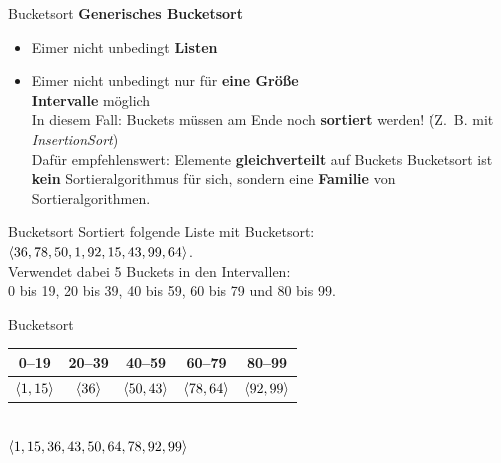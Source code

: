 \begin{frame}{Bucketsort}
	\textbf{Generisches Bucketsort} \\
	\begin{itemize}
		\item Eimer nicht unbedingt \textbf{Listen}
		\item Eimer nicht unbedingt nur für \textbf{eine Größe} \\
		\impl \textbf{Intervalle} möglich \\
		\§{\impl} In diesem Fall: Buckets müssen am Ende noch \textbf{sortiert} werden! 
		\. (Z.~B. mit \emph{InsertionSort}) \\
		\impl Dafür empfehlenswert: Elemente \textbf{gleichverteilt} auf Buckets
		\implitem Bucketsort ist \textbf{kein} Sortieralgorithmus für sich, sondern eine \textbf{Familie} von Sortieralgorithmen. 
	\end{itemize}
\end{frame}


\begin{frame}{Bucketsort}
	Sortiert folgende Liste mit Bucketsort: \\ $\langle 36, 78, 50, 1, 92, 15, 43, 99, 64 \rangle$. \\ 
	Verwendet dabei 5 Buckets in den Intervallen: \\
	0 bis 19, 20 bis 39, 40 bis 59, 60 bis 79 und 80 bis 99.
\end{frame}

\begin{frame}{Bucketsort}
	\solutionheading \medskip
	\begin{tabular}{ | c | c | c | c | c | }
		0–19 & 20–39 & 40–59 & 60–79 & 80–99
		\\ \hline
		$\langle  1, 15  \rangle$ & $\langle  36  \rangle$ & $\langle  50, 43  \rangle$ & $\langle  78, 64  \rangle$ & $\langle  92, 99  \rangle$
		\\ \hline
	\end{tabular}
	\\[0,25cm]
	\impl $\langle 1, 15, 36, 43, 50, 64, 78, 92, 99 \rangle$
\end{frame}

